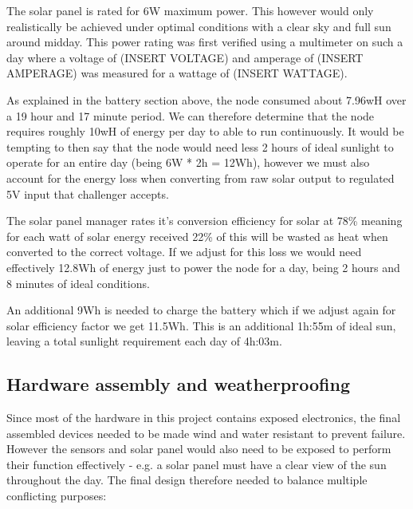 The solar panel is rated for 6W maximum power. This however would only
realistically be achieved under optimal conditions with a clear sky and full sun
around midday. This power rating was first verified using a multimeter on such a
day where a voltage of (INSERT VOLTAGE) and amperage of (INSERT AMPERAGE) was
measured for a wattage of (INSERT WATTAGE).

As explained in the battery section above, the node consumed about 7.96wH over a
19 hour and 17 minute period. We can therefore determine that the node requires
roughly 10wH of energy per day to able to run continuously. It would be tempting
to then say that the node would need less 2 hours of ideal sunlight to operate
for an entire day (being 6W * 2h = 12Wh), however we must also account for the
energy loss when converting from raw solar output to regulated 5V input that
challenger accepts.

The solar panel manager rates it's conversion efficiency for solar at 78\%
meaning for each watt of solar energy received 22\% of this will be wasted as
heat when converted to the correct voltage. If we adjust for this loss we would
need effectively 12.8Wh of energy just to power the node for a day, being 2
hours and 8 minutes of ideal conditions.

An additional 9Wh is needed to charge the battery which if we adjust again for
solar efficiency factor we get 11.5Wh. This is an additional 1h:55m of ideal
sun, leaving a total sunlight requirement each day of 4h:03m.

\subsection{Hardware assembly and weatherproofing}

Since most of the hardware in this project contains exposed electronics, the
final assembled devices needed to be made wind and water resistant to prevent
failure. However the sensors and solar panel would also need to be exposed to
perform their function effectively - e.g. a solar panel must have a clear view
of the sun throughout the day. The final design therefore needed to balance
multiple conflicting purposes:

